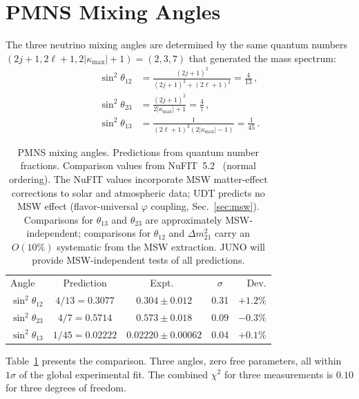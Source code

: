 \documentclass[aps,prd,twocolumn,superscriptaddress,nofootinbib,longbibliography]{revtex4-2}
\newcommand{\kmax}{|\kappa_{\mathrm{max}}|}
\begin{document}
\section{PMNS Mixing Angles}\label{sec:pmns}

The three neutrino mixing angles are determined by the same quantum
numbers $(2j+1, 2\ell+1, 2\kmax+1) = (2, 3, 7)$ that generated
the mass spectrum:
\begin{align}
  \sin^2\theta_{12} &= \frac{(2j+1)^2}{(2j+1)^2 + (2\ell+1)^2}
    = \frac{4}{13}\,, \label{eq:theta12}\\
  \sin^2\theta_{23} &= \frac{(2j+1)^2}{2\kmax + 1}
    = \frac{4}{7}\,, \label{eq:theta23}\\
  \sin^2\theta_{13} &= \frac{1}{(2\ell+1)^2(2\kmax - 1)}
    = \frac{1}{45}\,. \label{eq:theta13}
\end{align}

\begin{table}[t]
\caption{\label{tab:pmns}%
PMNS mixing angles.  Predictions from quantum number fractions.
Comparison values from NuFIT~5.2~\cite{NuFIT} (normal ordering).
The NuFIT values incorporate MSW matter-effect corrections to solar
and atmospheric data; UDT predicts no MSW effect (flavor-universal
$\varphi$ coupling, Sec.~\ref{sec:msw}).  Comparisons for
$\theta_{13}$ and $\theta_{23}$ are approximately MSW-independent;
comparisons for $\theta_{12}$ and $\Delta m^2_{21}$ carry an
$O(10\%)$ systematic from the MSW extraction.  JUNO will provide
MSW-independent tests of all predictions.}
\begin{ruledtabular}
\begin{tabular}{lcccr}
Angle & Prediction & Expt.\ & $\sigma$ & Dev. \\
\colrule
$\sin^2\theta_{12}$ & $4/13 = 0.3077$
  & $0.304 \pm 0.012$ & 0.31 & $+1.2\%$ \\
$\sin^2\theta_{23}$ & $4/7 = 0.5714$
  & $0.573 \pm 0.018$ & 0.09 & $-0.3\%$ \\
$\sin^2\theta_{13}$ & $1/45 = 0.02222$
  & $0.02220 \pm 0.00062$ & 0.04 & $+0.1\%$ \\
\end{tabular}
\end{ruledtabular}
\end{table}

Table~\ref{tab:pmns} presents the comparison.  Three angles, zero
free parameters, all within $1\sigma$ of the global experimental
fit.  The combined $\chi^2$ for three measurements is $0.10$ for
three degrees of freedom.
\end{document}
